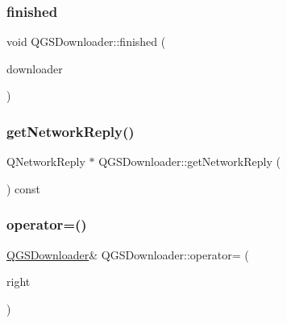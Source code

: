 \mbox{\label{class_q_g_s_downloader_af9bde826ed2de6cee5bc0343fa77168a}} 
\subsubsection{\texorpdfstring{finished}{finished}}
{\footnotesize\ttfamily void Q\+G\+S\+Downloader\+::finished (\begin{DoxyParamCaption}\item[{\mbox{\hyperlink{class_q_g_s_downloader}{Q\+G\+S\+Downloader}} $\ast$}]{downloader }\end{DoxyParamCaption})\hspace{0.3cm}{\ttfamily [signal]}}

\mbox{\label{class_q_g_s_downloader_a5aee4d36e29f76d8304e6fc79afea207}} 
\subsubsection{\texorpdfstring{get\+Network\+Reply()}{getNetworkReply()}}
{\footnotesize\ttfamily Q\+Network\+Reply $\ast$ Q\+G\+S\+Downloader\+::get\+Network\+Reply (\begin{DoxyParamCaption}{ }\end{DoxyParamCaption}) const}

\mbox{\label{class_q_g_s_downloader_a1f3b205503643216d77ced3f40d2f657}} 
\subsubsection{\texorpdfstring{operator=()}{operator=()}\hspace{0.1cm}{\footnotesize\ttfamily [1/2]}}
{\footnotesize\ttfamily \mbox{\hyperlink{class_q_g_s_downloader}{Q\+G\+S\+Downloader}}\& Q\+G\+S\+Downloader\+::operator= (\begin{DoxyParamCaption}\item[{const \mbox{\hyperlink{class_q_g_s_downloader}{Q\+G\+S\+Downloader}} \&}]{right }\end{DoxyParamCaption})\hspace{0.3cm}{\ttfamily [delete]}}

